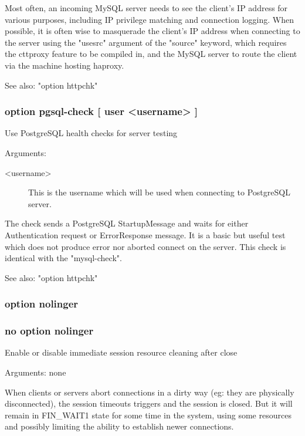   Most often, an incoming MySQL server needs to see the client's IP address for
  various purposes, including IP privilege matching and connection logging.
  When possible, it is often wise to masquerade the client's IP address when
  connecting to the server using the "usesrc" argument of the "source" keyword,
  which requires the cttproxy feature to be compiled in, and the MySQL server
  to route the client via the machine hosting haproxy.

  See also: "option httpchk"

\subsubsection[option pgsql-check]{option pgsql-check [ user <username> ]}


  Use PostgreSQL health checks for server testing


  Arguments:
\begin{description}
\item[<username>] This is the username which will be used when connecting to
               PostgreSQL server.
\end{description}

  The check sends a PostgreSQL StartupMessage and waits for either
  Authentication request or ErrorResponse message. It is a basic but useful
  test which does not produce error nor aborted connect on the server.
  This check is identical with the "mysql-check".

  See also: "option httpchk"

\subsubsection{option nolinger}
\subsubsection{no option nolinger}


  Enable or disable immediate session resource cleaning after close


  Arguments: none

  When clients or servers abort connections in a dirty way (eg: they are
  physically disconnected), the session timeouts triggers and the session is
  closed. But it will remain in FIN\_WAIT1 state for some time in the system,
  using some resources and possibly limiting the ability to establish newer
  connections.

